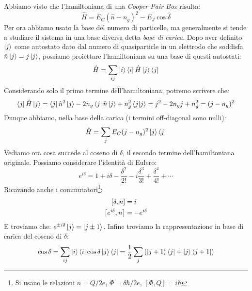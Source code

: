 \vspace{0.5cm}
\newline
\noindent {}
\vspace{0.5cm}
\noindent Abbiamo visto che l'hamiltoniana di una \textit{Cooper Pair Box} risulta:
\begin{equation*}
    \hat H = E_C (\hat n - n_{g})^2 - E_J \cos{\hat \delta}
\end{equation*}
Per ora abbiamo usato la base del numero di particelle, ma generalmente si tende a studiare il sistema in una base diversa detta \textit{base di carica}.
Dopo aver definito $\ket j$ come autostato dato dal numero di quasiparticle in un elettrodo che soddisfa $\hat n \ket j = j \ket j$, possiamo proiettare l'hamiltoniana su una base di questi autostati:
\begin{equation*}
    \hat H = \sum_{ij} \ket{i}\bra{i}\hat H \ket{j}\bra{j}
\end{equation*}
Considerando solo il primo termine dell'hamiltoniana, potremo scrivere che:
\begin{equation*}
    \bra{j} \hat H \ket{j} = \bra{j}\hat n^2 \ket{j}-2n_g \bra{j}\hat n \ket{j} + n_g^2 \braket{j}{j} = j^2 - 2n_g j + n_g^2 = (j - n_g)^2
\end{equation*}
Dunque abbiamo, nella base della carica (i termini off-diagonal sono nulli):
\begin{equation*}
    \hat H =\sum_j E_C (j - n_g)^2\ket{j}\bra{j}
\end{equation*}
Vediamo ora cosa succede al coseno di $\delta$, il secondo termine dell'hamiltoniana originale.
Possiamo considerare l'identità di Eulero:
\begin{equation*}
    e^{i\delta} = 1 + i \delta - \frac{\delta^2}{2!}-i\frac{\delta^3}{3!} +\frac{\delta^4}{4!}+\cdots
\end{equation*}
Ricavando anche i commutatori\footnote{Si usano le relazioni $n=Q/2e$, $\Phi = \delta \hbar / 2e$, $[\Phi, Q] = i \hbar$}:
\begin{align*}
    \comm{\delta}{n} &= i \\
    \comm{e^{i\delta}}{n} &= -e^{i\delta}
\end{align*}
E troviamo che: $e^{\pm i \delta}\ket j = \ket{j\pm 1}$.
Infine troviamo la rappresentazione in base di carica del coseno di $\delta$:
\begin{equation*}
    \cos \delta = \sum_{ij} \ket i \bra i \cos \delta \ket j \bra j = \frac{1}{2}\sum_j \left(\ket{j+1}\bra{j}+ \ket{j}\bra{j+1}\right)
\end{equation*}
